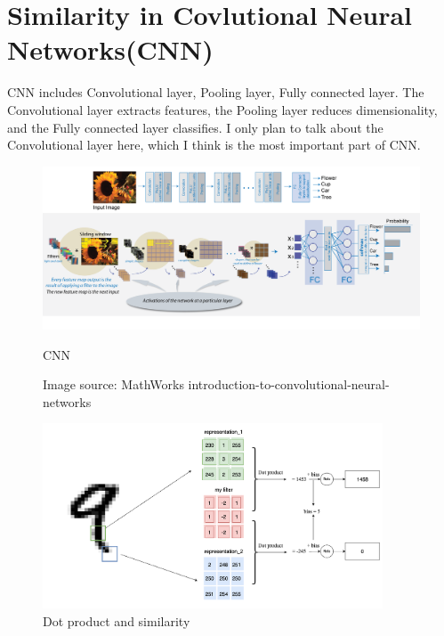 \documentclass[oneside]{book}
\begin{document}
\section{Similarity in Covlutional Neural Networks(CNN)}
CNN includes Convolutional layer, Pooling layer, Fully connected layer. The Convolutional layer extracts features, the Pooling layer reduces dimensionality, and the Fully connected layer classifies.
I only plan to talk about the Convolutional layer here, which I think is the most important part of CNN.
\begin{figure}[H]
        \centering
        \includegraphics[width=1.0\textwidth]{images/CNN.png}
        \caption{CNN}
        \caption*{Image source: MathWorks introduction-to-convolutional-neural-networks}
\end{figure}
\begin{figure}[H]
        \centering
        \includegraphics[width=0.9\textwidth]{images/CNN_si.png}
        \caption{Dot product and similarity}
\end{figure}
\end{document}
